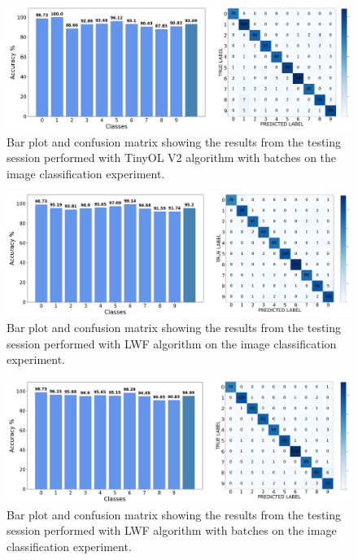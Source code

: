 \documentclass[12pt]{report}
\begin{document}
\begin{figure}[h!]
    \centering
    \includegraphics[width=140mm]{Figures/Chapter5/OPENMV_OLV2_BATCH.png} 
    \caption{Bar plot and confusion matrix showing the results from the testing session performed with TinyOL V2 algorithm with batches on the image classification experiment.}
    \label{fig:openmv_res_OL_v2_batch}    
\end{figure}

\begin{figure}[h!]
    \centering
    \includegraphics[width=140mm]{Figures/Chapter5/OPENMV_LWF.png} 
    \caption{Bar plot and confusion matrix showing the results from the testing session performed with LWF algorithm on the image classification experiment.}
    \label{fig:openmv_res_LWF}    
\end{figure}

\begin{figure}[h!]
    \centering
    \includegraphics[width=140mm]{Figures/Chapter5/OPENMV_LWF_BATCH.png} 
    \caption{Bar plot and confusion matrix showing the results from the testing session performed with LWF algorithm with batches on the image classification experiment.}
    \label{fig:openmv_res_LWF_batch}    
\end{figure}
\end{document}
